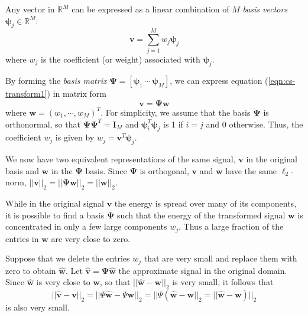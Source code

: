 Any vector in $\mathbb{R}^M$ can be expressed as a linear combination of $M$ \emph{basis vectors} $\bm\psi_j \in \mathbb{R}^M$:
\begin{equation}
\label{eqn:cs-transform1}
  \bm v = \sum_{j=1}^M w_j \bm\psi_j
\end{equation}
where $w_j$ is the coefficient (or weight) associated with $\bm\psi_j$.

By forming the \emph{basis matrix} $\bm\Psi = \left[\bm\psi_1 \,\cdots\, \bm\psi_M\right]$, we can express equation (\ref{eqn:cs-transform1}) in matrix form
\begin{equation*}
\bm v = \bm\Psi \bm w
\end{equation*}
where $\bm w = (w_1,\cdots,w_M)^T$.
For simplicity, we assume that the basis $\bm\Psi$ is orthonormal, so that $\bm\Psi\bm\Psi^T = \bm I_M$ and $\bm\psi_i^T\bm\psi_j$ is 1 if $i = j$ and 0 otherwise.
Thus, the coefficient $w_j$ is given by $w_j = \bm v^T\bm\psi_j$.

We now have two equivalent representations of the same signal, $\bm v$ in the original basis and $\bm w$ in the $\bm\Psi$ basis.
Since $\bm\Psi$ is orthogonal, $\bm v$ and $\bm w$ have the same $\ell_2$-norm, $||\bm v||_2 = ||\bm\Psi\bm w||_2 = ||\bm w||_2$.

While in the original signal $\bm v$ the energy is spread over many of its components, it is possible to find a basis $\bm\Psi$ such that the energy of the transformed signal $\bm w$ is concentrated in only a few large components $w_j$.
Thus a large fraction of the entries in $\bm w$ are very close to zero.

Suppose that we delete the entries $w_j$ that are very small and replace them with zero to obtain $\bm{\hat w}$.
Let $\bm{\hat v} = \bm\Psi\hat{\bm w}$ the approximate signal in the original domain.
Since $\bm{\hat w}$ is very close to $\bm w$, so that $||\bm{\hat w} - \bm w||_2$ is very small, it follows that
\begin{equation*}
  ||\bm{\hat v} - \bm v||_2 = ||\Psi\bm{\hat w} - \Psi\bm w||_2 = ||\Psi (\bm{\hat w} - \bm w||_2 = ||\bm{\hat w} - \bm w)||_2
\end{equation*}
is also very small.

